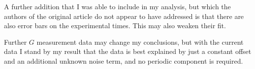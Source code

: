 \documentclass[doublecol]{epl2}
\begin{document}
A further addition that I was able to include in my analysis, but which the authors of the original 
article do not appear to have addressed is that there are also error bars on the
experimental times. This may also weaken their fit.

Further $G$ measurement data may change my conclusions, but with the current data I stand by my 
result that the data is best explained by just a constant offset and an additional unknown 
noise term, and no periodic component is required.



\end{document}
